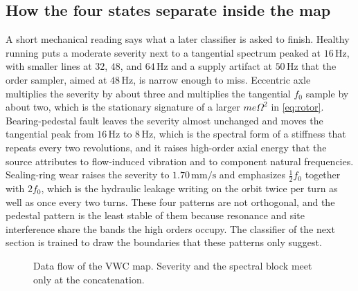 \subsection{How the four states separate inside the map}

A short mechanical reading says what a later classifier is asked to finish.
Healthy running puts a moderate severity next to a tangential spectrum peaked at \(16\,\mathrm{Hz}\), with smaller lines at \(32\), \(48\), and \(64\,\mathrm{Hz}\) and a supply artifact at \(50\,\mathrm{Hz}\) that the order sampler, aimed at \(48\,\mathrm{Hz}\), is narrow enough to miss.
Eccentric axle multiplies the severity by about three and multiplies the tangential \(f_{0}\) sample by about two, which is the stationary signature of a larger \(me\Omega^{2}\) in \eqref{eq:rotor}.
Bearing-pedestal fault leaves the severity almost unchanged and moves the tangential peak from \(16\,\mathrm{Hz}\) to \(8\,\mathrm{Hz}\), which is the spectral form of a stiffness that repeats every two revolutions, and it raises high-order axial energy that the source attributes to flow-induced vibration and to component natural frequencies.
Sealing-ring wear raises the severity to \(1.70\,\mathrm{mm/s}\) and emphasizes \(\tfrac12 f_{0}\) together with \(2f_{0}\), which is the hydraulic leakage writing on the orbit twice per turn as well as once every two turns.
These four patterns are not orthogonal, and the pedestal pattern is the least stable of them because resonance and site interference share the bands the high orders occupy.
The classifier of the next section is trained to draw the boundaries that these patterns only suggest.

\begin{figure}[H]
\centering
{}
\caption{Data flow of the VWC map. Severity and the spectral block meet only at the concatenation.}
\label{fig:vwcflow}
\end{figure}

